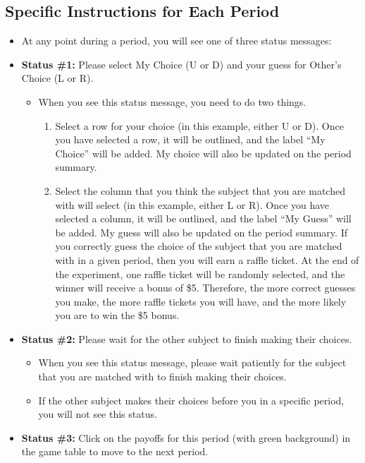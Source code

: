 \documentclass[11pt]{article}
\newcommand{\dblbkt}[1]{\ignorespaces}
\begin{document}
\subsection*{\dblbkt{2} Specific Instructions for Each Period} 
\begin{itemize} 
\item At any point during a period, you will see one of three status messages:
\item {\bf Status \#1:} Please select My Choice (U or D) and your guess for Other's Choice (L or R).
\begin{itemize} 
\item When you see this status message, you need to do two things. 
\begin{enumerate} 
\item Select a row for your choice (in this example, either U or D).  \dblbkt{1} Once you have selected a row, it will be outlined, and the label ``My Choice'' will be added.  \dblbkt{1} My choice will also be updated on the period summary.
\item Select the column that you think the subject that you are matched with will select (in this example, either L or R). \dblbkt{1} Once you have selected a column, it will be outlined, and the label ``My Guess'' will be added.  \dblbkt{1} My guess will also be updated on the period summary.  If you correctly guess the choice of the subject that you are matched with in a given period, then you will earn a raffle ticket.  At the end of the experiment, one raffle ticket will be randomly selected, and the winner will receive a bonus of \$5.  Therefore, the more correct guesses you make, the more raffle tickets you will have, and the more likely you are to win the \$5 bonus.
\end{enumerate} 
\end{itemize} 
\item \dblbkt{1} {\bf Status \#2:} Please wait for the other subject to finish making their choices.
\begin{itemize} 
\item When you see this status message, please wait patiently for the subject that you are matched with to finish making their choices. 
\item If the other subject makes their choices before you in a specific period, you will not see this status.
\end{itemize} 
\item \dblbkt{1} {\bf Status \#3:} Click on the payoffs for this period (with green background) in the game table to move to the next period.

\end{itemize}
\end{document}

